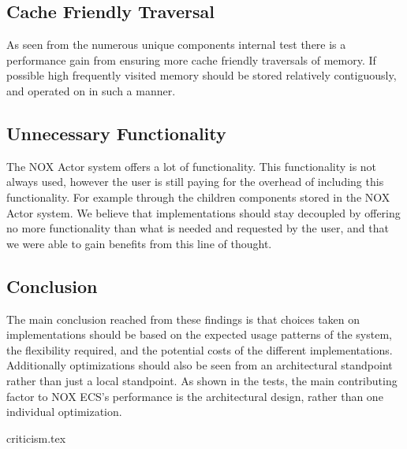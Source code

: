 \subsection{Cache Friendly Traversal}
As seen from the numerous unique components internal test there is a performance gain from
ensuring more cache friendly traversals of memory.
If possible high frequently visited memory should be stored relatively contiguously,
and operated on in such a manner.

\subsection{Unnecessary Functionality}
The NOX Actor system offers a lot of functionality. This functionality is not always used,
however the user is still paying for the overhead of including this functionality. For example through the children components
stored in the NOX Actor system.
We believe that implementations should stay decoupled by offering no more functionality than what is needed
and requested by the user, and that we were able to gain benefits from this line of thought.

\subsection{Conclusion}
The main conclusion reached from these findings is that choices taken on implementations
should be based on the expected usage patterns of the system, the flexibility required,
and the potential costs of the different implementations.
Additionally optimizations should also be seen from an architectural standpoint rather than
just a local standpoint. As shown in the tests, the main contributing factor to NOX ECS's performance
is the architectural design, rather than one individual optimization.

{criticism.tex}
